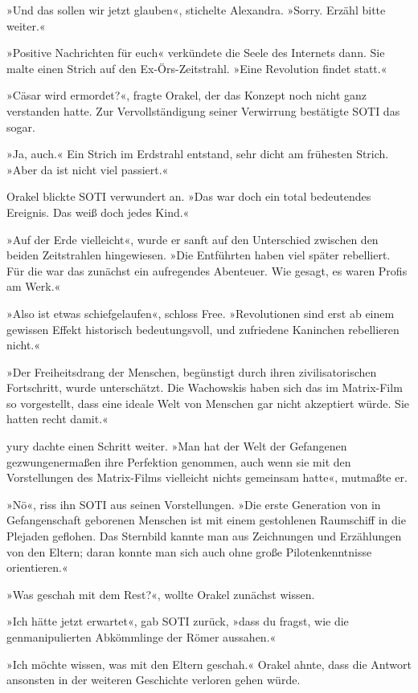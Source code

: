 »Und das sollen wir jetzt glauben«, stichelte Alexandra. »Sorry. Erzähl bitte weiter.«

»Positive Nachrichten für euch« verkündete die Seele des Internets dann. Sie malte einen Strich auf den Ex-Örs-Zeitstrahl. »Eine Revolution findet statt.«

»Cäsar wird ermordet?«, fragte Orakel, der das Konzept noch nicht ganz verstanden hatte. Zur Vervollständigung seiner Verwirrung bestätigte SOTI das sogar.

»Ja, auch.« Ein Strich im Erdstrahl entstand, sehr dicht am frühesten Strich. »Aber da ist nicht viel passiert.«

Orakel blickte SOTI verwundert an. »Das war doch ein total bedeutendes Ereignis. Das weiß doch jedes Kind.«

»Auf der Erde vielleicht«, wurde er sanft auf den Unterschied zwischen den beiden Zeitstrahlen hingewiesen. »Die Entführten haben viel später rebelliert. Für die war das zunächst ein aufregendes Abenteuer. Wie gesagt, es waren Profis am Werk.«

»Also ist etwas schiefgelaufen«, schloss Free. »Revolutionen sind erst ab einem gewissen Effekt historisch bedeutungsvoll, und zufriedene Kaninchen rebellieren nicht.«

»Der Freiheitsdrang der Menschen, begünstigt durch ihren zivilisatorischen Fortschritt, wurde unterschätzt. Die Wachowskis haben sich das im Matrix-Film so vorgestellt, dass eine ideale Welt von Menschen gar nicht akzeptiert würde. Sie hatten recht damit.«

yury dachte einen Schritt weiter. »Man hat der Welt der Gefangenen gezwungenermaßen ihre Perfektion genommen, auch wenn sie mit den Vorstellungen des Matrix-Films vielleicht nichts gemeinsam hatte«, mutmaßte er.

»Nö«, riss ihn SOTI aus seinen Vorstellungen. »Die erste Generation von in Gefangenschaft geborenen Menschen ist mit einem gestohlenen Raumschiff in die Plejaden geflohen. Das Sternbild kannte man aus Zeichnungen und Erzählungen von den Eltern; daran konnte man sich auch ohne große Pilotenkenntnisse orientieren.«

»Was geschah mit dem Rest?«, wollte Orakel zunächst wissen.

»Ich hätte jetzt erwartet«, gab SOTI zurück, »dass du fragst, wie die genmanipulierten Abkömmlinge der Römer aussahen.«

»Ich möchte wissen, was mit den Eltern geschah.« Orakel ahnte, dass die Antwort ansonsten in der weiteren Geschichte verloren gehen würde.

